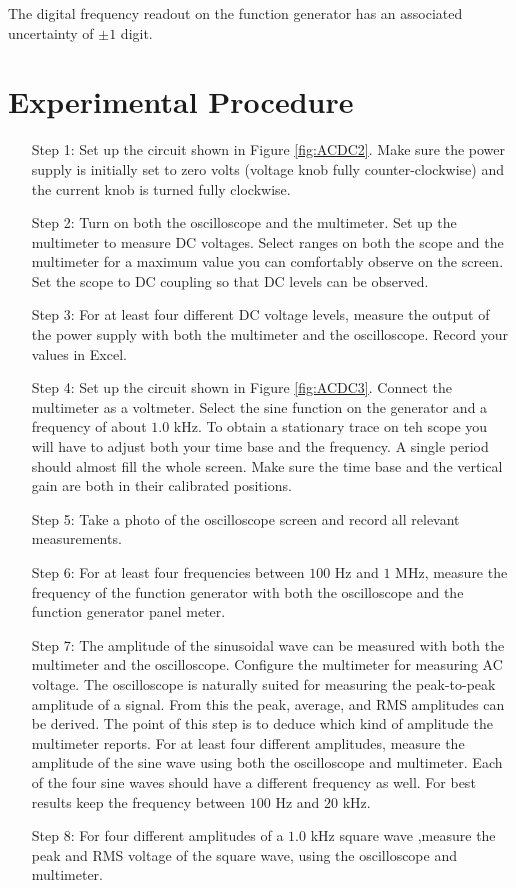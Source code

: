 \documentclass[12pt, a4paper, oneside, openright, titlepage]{book}
\begin{document}
\noindent The digital frequency readout on the function generator has an associated uncertainty of $\pm 1$ digit.

\section{Experimental Procedure}


\begin{itemize}[leftmargin = 50pt]
    \item[Step 1:] Set up the circuit shown in Figure \ref{fig:ACDC2}. Make sure the power supply is initially set to zero volts (voltage knob fully counter-clockwise) and the current knob is turned fully clockwise.
    \item[Step 2:] Turn on both the oscilloscope and the multimeter. Set up the multimeter to measure DC voltages. Select ranges on both the scope and the multimeter for a maximum value you can comfortably observe on the screen. Set the scope to DC coupling so that DC levels can be observed.
    \item[Step 3:] For at least four different DC voltage levels, measure the output of the power supply with both the multimeter and the oscilloscope. Record your values in Excel.
    \item[Step 4:] Set up the circuit shown in Figure \ref{fig:ACDC3}. Connect the multimeter as a voltmeter. Select the sine function on the generator and a frequency of about $1.0$ kHz. To obtain a stationary trace on teh scope you will have to adjust both your time base and the frequency. A single period should almost fill the whole screen. Make sure the time base and the vertical gain are both in their calibrated positions.
    \item[Step 5:] Take a photo of the oscilloscope screen and record all relevant measurements.
    \item[Step 6:] For at least four frequencies between $100$ Hz and $1$ MHz, measure the frequency of the function generator with both the oscilloscope and the function generator panel meter. 
    \item[Step 7:] The amplitude of the sinusoidal wave can be measured with both the multimeter and the oscilloscope. Configure the multimeter for measuring AC voltage. The oscilloscope is naturally suited for measuring the peak-to-peak amplitude of a signal. From this the peak, average, and RMS amplitudes can be derived. The point of this step is to deduce which kind of amplitude the multimeter reports. For at least four different amplitudes, measure the amplitude of the sine wave using both the oscilloscope and multimeter. Each of the four sine waves should have a different frequency as well. For best results keep the frequency between $100$ Hz and $20$ kHz.
    \item[Step 8:] For four different amplitudes of a $1.0$ kHz square wave ,measure the peak and RMS voltage of the square wave, using the oscilloscope and multimeter.
\end{itemize}
\end{document}

